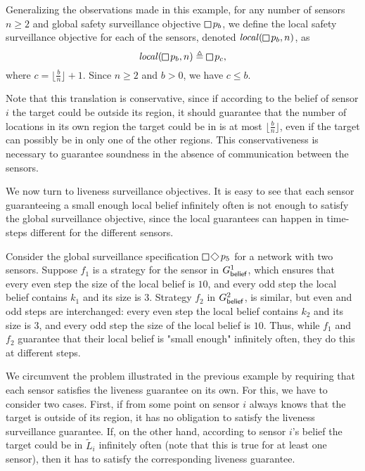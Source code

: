 Generalizing the observations made in this example, for any number of sensors $n \geq 2$ and global safety surveillance objective $\LTLglobally p_b$, we define the local safety surveillance objective for each of the sensors, denoted $\locspec(\LTLglobally p_b,n)$, as \[\locspec(\LTLglobally p_b,n) \triangleq \LTLglobally p_c,\] where $c = \lfloor{\frac{b}{n}}\rfloor+1$. Since $n \geq 2$ and $b >0$, we have $c \leq b$.

Note that this translation is conservative, since if according to the belief of sensor $i$ the target could be outside its region, it should guarantee that the number of locations in its own region the target could be in is at most  $\lfloor{\frac{b}{n}}\rfloor$, even if the target can possibly be in only one of the other regions. This conservativeness is necessary to guarantee soundness in the absence of communication between the sensors.

We now turn to liveness surveillance objectives. It is easy to see that each sensor guaranteeing a small enough local belief infinitely often is not enough to satisfy the global surveillance objective, since the local guarantees can happen in time-steps different for the different sensors.

\begin{example}\label{ex:global-local-liveness}
Consider the global surveillance specification $\LTLglobally\LTLfinally p_5$ for a network with two sensors. Suppose $f_1$ is a strategy for the sensor in $G^1_{\mathsf{belief}}$,  which ensures that every even step the size of the local belief is $10$, and every odd step the local belief contains $k_1$ and its size is $3$. Strategy  $f_2$ in $G^2_{\mathsf{belief}}$,  is similar, but even and odd steps are interchanged: every even step the local belief contains $k_2$ and its size is $3$, and every odd step the size of the local belief is $10$.  Thus, while $f_1$ and $f_2$ guarantee that their local belief is "small enough" infinitely often, they do this at different steps.
\end{example}

We circumvent the problem illustrated in the previous example by requiring that each sensor satisfies the liveness guarantee on its own. For this, we have to consider two cases. First, if from some point on sensor $i$ always knows that the target is outside of its region, it has no obligation to satisfy the liveness surveillance guarantee. If, on the other hand, according to sensor $i$'s belief the target could be in $\widetilde L_i$ infinitely often (note that this is true for at least one sensor), then it has to satisfy the corresponding liveness guarantee.

